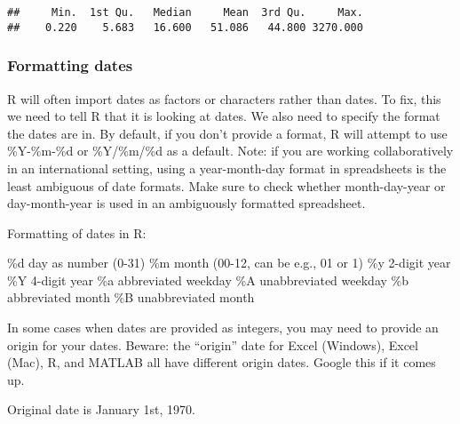\documentclass[]{article}
\newenvironment{Shaded}{\begin{snugshade}}{\end{snugshade}}
\newcommand{\CommentTok}[1]{\textcolor[rgb]{0.56,0.35,0.01}{\textit{#1}}}
\newcommand{\DataTypeTok}[1]{\textcolor[rgb]{0.13,0.29,0.53}{#1}}
\newcommand{\KeywordTok}[1]{\textcolor[rgb]{0.13,0.29,0.53}{\textbf{#1}}}
\newcommand{\NormalTok}[1]{#1}
\newcommand{\OperatorTok}[1]{\textcolor[rgb]{0.81,0.36,0.00}{\textbf{#1}}}
\newcommand{\StringTok}[1]{\textcolor[rgb]{0.31,0.60,0.02}{#1}}
\begin{document}
\begin{verbatim}
##     Min.  1st Qu.   Median     Mean  3rd Qu.     Max. 
##    0.220    5.683   16.600   51.086   44.800 3270.000
\end{verbatim}

\hypertarget{formatting-dates}{%
\subsubsection{Formatting dates}\label{formatting-dates}}

R will often import dates as factors or characters rather than dates. To
fix, this we need to tell R that it is looking at dates. We also need to
specify the format the dates are in. By default, if you don't provide a
format, R will attempt to use \%Y-\%m-\%d or \%Y/\%m/\%d as a default.
Note: if you are working collaboratively in an international setting,
using a year-month-day format in spreadsheets is the least ambiguous of
date formats. Make sure to check whether month-day-year or
day-month-year is used in an ambiguously formatted spreadsheet.

Formatting of dates in R:

\%d day as number (0-31) \%m month (00-12, can be e.g., 01 or 1) \%y
2-digit year \%Y 4-digit year \%a abbreviated weekday \%A unabbreviated
weekday \%b abbreviated month \%B unabbreviated month

In some cases when dates are provided as integers, you may need to
provide an origin for your dates. Beware: the ``origin'' date for Excel
(Windows), Excel (Mac), R, and MATLAB all have different origin dates.
Google this if it comes up.

Original date is January 1st, 1970.

\begin{Shaded}
\end{Shaded}
\end{document}
